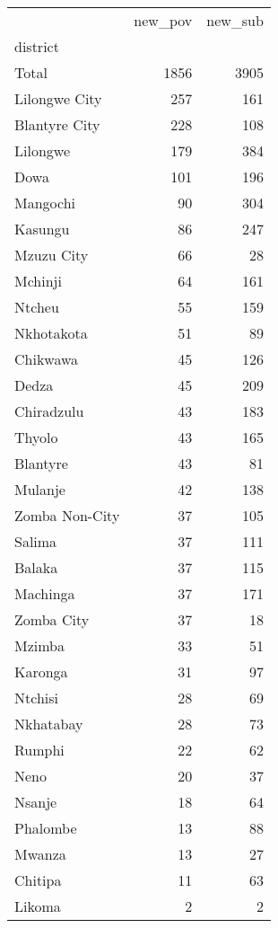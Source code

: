 \begin{tabular}{lrr}
\toprule
{} &  new\_pov &  new\_sub \\
district       &          &          \\
\midrule
Total          &     1856 &     3905 \\
Lilongwe City  &      257 &      161 \\
Blantyre City  &      228 &      108 \\
Lilongwe       &      179 &      384 \\
Dowa           &      101 &      196 \\
Mangochi       &       90 &      304 \\
Kasungu        &       86 &      247 \\
Mzuzu City     &       66 &       28 \\
Mchinji        &       64 &      161 \\
Ntcheu         &       55 &      159 \\
Nkhotakota     &       51 &       89 \\
Chikwawa       &       45 &      126 \\
Dedza          &       45 &      209 \\
Chiradzulu     &       43 &      183 \\
Thyolo         &       43 &      165 \\
Blantyre       &       43 &       81 \\
Mulanje        &       42 &      138 \\
Zomba Non-City &       37 &      105 \\
Salima         &       37 &      111 \\
Balaka         &       37 &      115 \\
Machinga       &       37 &      171 \\
Zomba City     &       37 &       18 \\
Mzimba         &       33 &       51 \\
Karonga        &       31 &       97 \\
Ntchisi        &       28 &       69 \\
Nkhatabay      &       28 &       73 \\
Rumphi         &       22 &       62 \\
Neno           &       20 &       37 \\
Nsanje         &       18 &       64 \\
Phalombe       &       13 &       88 \\
Mwanza         &       13 &       27 \\
Chitipa        &       11 &       63 \\
Likoma         &        2 &        2 \\
\bottomrule
\end{tabular}
